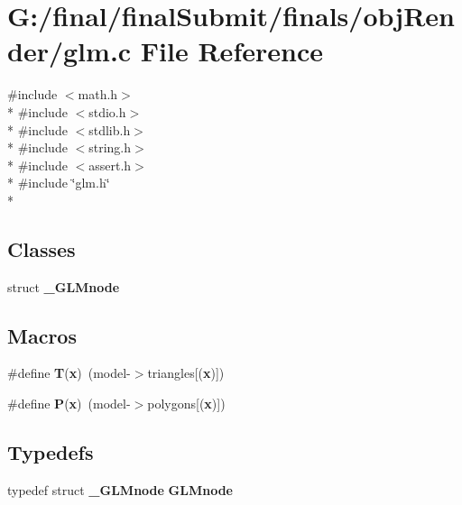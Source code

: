\section{G\-:/final/final\-Submit/finals/obj\-Render/glm.c File Reference}
\label{glm_8c}
{\ttfamily \#include $<$math.\-h$>$}\\*
{\ttfamily \#include $<$stdio.\-h$>$}\\*
{\ttfamily \#include $<$stdlib.\-h$>$}\\*
{\ttfamily \#include $<$string.\-h$>$}\\*
{\ttfamily \#include $<$assert.\-h$>$}\\*
{\ttfamily \#include \char`\"{}glm.\-h\char`\"{}}\\*
\subsection*{Classes}
\begin{DoxyCompactItemize}
\item 
struct {\bf \-\_\-\-G\-L\-Mnode}
\end{DoxyCompactItemize}
\subsection*{Macros}
\begin{DoxyCompactItemize}
\item 
\#define {\bf T}({\bf x})~(model-\/$>$triangles[({\bf x})])
\item 
\#define {\bf P}({\bf x})~(model-\/$>$polygons[({\bf x})])
\end{DoxyCompactItemize}
\subsection*{Typedefs}
\begin{DoxyCompactItemize}
\item 
typedef struct {\bf \-\_\-\-G\-L\-Mnode} {\bf G\-L\-Mnode}
\end{DoxyCompactItemize}
